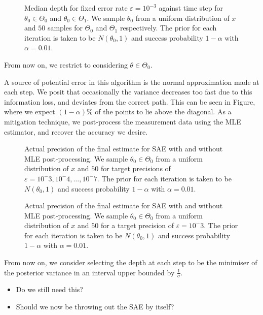 \begin{figure}[htb]
	\centering
	\caption{Median depth for fixed error rate $\varepsilon = 10^{-3}$ against time step for $\theta_0 \in \Theta_0$ and $\theta_0 \in \Theta_1$. We sample $\theta_0$ from a uniform distribution of $x$ and $50$ samples for $\Theta_0$ and $ \Theta_1$ respectively. The prior for each iteration is taken to be $N(\theta_0, 1)$ and success probability $1 - \alpha$ with $\alpha = 0.01$.}
	\label{fig::ExAE-depth-per-step}
\end{figure}

From now on, we restrict to considering $\theta \in \Theta_0$. 

A source of potential error in this algorithm is the normal approximation made at each step. We posit that occasionally the variance decreases too fast due to this information loss, and deviates from the correct path. This can be seen in Figure, where we expect $(1-\alpha)\%$ of the points to lie above the diagonal. As a mitigation technique, we post-process the measurement data using the MLE estimator, and recover the accuracy we desire.

\begin{figure}
	\centering
	\caption{Actual precision of the final estimate for SAE with and without MLE post-processing. We sample $\theta_0 \in \Theta_0$ from a uniform distribution of $x$ and $50$ for target precisions of $\varepsilon = 10^-3, 10^-4, \ldots, 10^-7 $. The prior for each iteration is taken to be $N(\theta_0, 1)$ and success probability $1 - \alpha$ with $\alpha = 0.01$.}
	\label{fig::ExAE-actual-prec-vs-expected-prec}
\end{figure}

\begin{figure}
	\centering
	\caption{Actual precision of the final estimate for SAE with and without MLE post-processing. We sample $\theta_0 \in \Theta_0$ from a uniform distribution of $x$ and $50$ for a target precision of $\varepsilon = 10^-3$. The prior for each iteration is taken to be $N(\theta_0, 1)$ and success probability $1 - \alpha$ with $\alpha = 0.01$.}
	\label{fig::ExAE-actual-prec-over-theta}
\end{figure}

From now on, we consider selecting the depth at each step to be the minimiser of the posterior variance in an interval upper bounded by $\frac{1}{\sigma}$.
\begin{itemize}
	\color{red}
	\item Do we still need this?
	\item Should we now be throwing out the SAE by itself?
\end{itemize}

